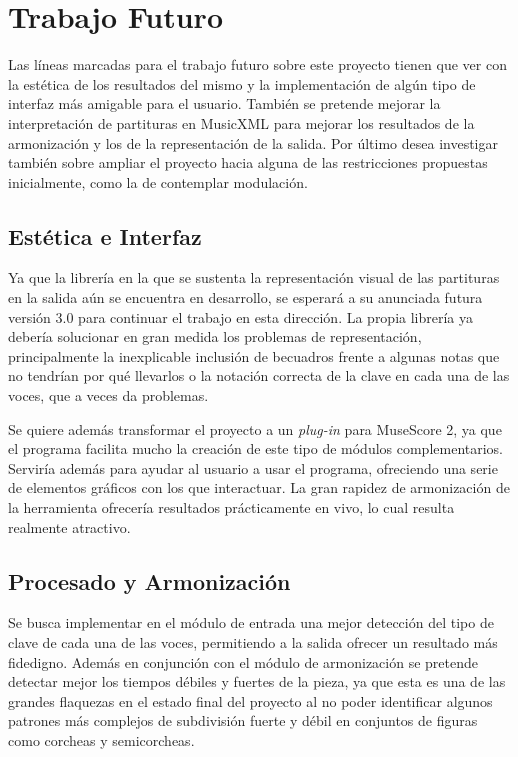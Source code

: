  
\section{Trabajo Futuro}
Las líneas marcadas para el trabajo futuro sobre este proyecto tienen que ver con la estética de los resultados del mismo y la implementación de algún tipo de interfaz más amigable para el usuario. También se pretende mejorar la interpretación de partituras en MusicXML para mejorar los resultados de la armonización y los de la representación de la salida. Por último desea investigar también sobre ampliar el proyecto hacia alguna de las restricciones propuestas inicialmente, como la de contemplar modulación.

\subsection{Estética e Interfaz}
Ya que la librería en la que se sustenta la representación visual de las partituras en la salida aún se encuentra en desarrollo, se esperará a su anunciada futura versión 3.0 para continuar el trabajo en esta dirección. La propia librería ya debería solucionar en gran medida los problemas de representación, principalmente la inexplicable inclusión de becuadros frente a algunas notas que no tendrían por qué llevarlos o la notación correcta de la clave en cada una de las voces, que a veces da problemas. 

Se quiere además transformar el proyecto a un \textit{plug-in} para MuseScore 2, ya que el programa facilita mucho la creación de este tipo de módulos complementarios. Serviría además para ayudar al usuario a usar el programa, ofreciendo una serie de elementos gráficos con los que interactuar. La gran rapidez de armonización de la herramienta ofrecería resultados prácticamente en vivo, lo cual resulta realmente atractivo. 

\subsection{Procesado y Armonización}
Se busca implementar en el módulo de entrada una mejor detección del tipo de clave de cada una de las voces, permitiendo a la salida ofrecer un resultado más fidedigno. Además en conjunción con el módulo de armonización se pretende detectar mejor los tiempos débiles y fuertes de la pieza, ya que esta es una de las grandes flaquezas en el estado final del proyecto al no poder identificar algunos patrones más complejos de subdivisión fuerte y débil en conjuntos de figuras como corcheas y semicorcheas.

